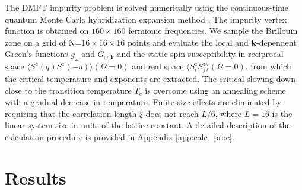 \documentclass[aps,prb,twocolumn,amsmath,notitlepage,floatfix,footinbib,superscriptaddress,showpacs, showkeys]{revtex4-1}
\newcommand{\kay}{\mathbf{k}}
\begin{document}
The DMFT impurity problem is solved numerically using the continuous-time quantum Monte Carlo hybridization expansion method \cite{Hafermann2013,GullMillis:2011,WernerComanac:2006}. The impurity vertex function is obtained on $160\times 160$ fermionic frequencies.
We sample the Brillouin zone on a grid of N=$16\times16\times16$ points and evaluate the local and $\kay$-dependent Green's functions $g_{\omega}$ and $G_{\omega, \kay}$ and the static spin susceptibility in reciprocal space $\langle S^z(q) S^z(-q) \rangle(\Omega = 0)$ and real space $\langle S^z_i S^z_j \rangle (\Omega = 0)$, from which the critical temperature and exponents are extracted. 
The critical slowing-down close to the transition temperature $T_c$ is overcome using an annealing scheme with a gradual decrease in temperature. 
Finite-size effects are eliminated by requiring that the correlation length $\xi$ does not reach $L/6$, where $L = 16$ is the linear system size in units of the lattice constant. 
A detailed description of the calculation procedure is provided in Appendix \ref{app:calc_proc}.

\section{Results}
\end{document}
